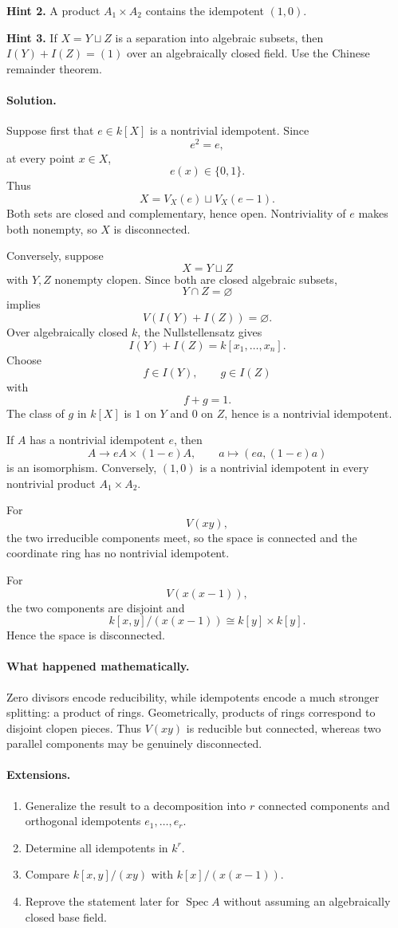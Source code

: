 \textbf{Hint 2.} A product \(A_1\times A_2\) contains the idempotent \((1,0)\).

\textbf{Hint 3.} If \(X=Y\sqcup Z\) is a separation into algebraic subsets, then
\(I(Y)+I(Z)=(1)\) over an algebraically closed field.  Use the Chinese remainder theorem.

\paragraph{Solution.}
Suppose first that \(e\in k[X]\) is a nontrivial idempotent.  Since
\[
e^2=e,
\]
at every point \(x\in X\),
\[
e(x)\in\{0,1\}.
\]
Thus
\[
X=V_X(e)\sqcup V_X(e-1).
\]
Both sets are closed and complementary, hence open.  Nontriviality of \(e\) makes both
nonempty, so \(X\) is disconnected.

Conversely, suppose
\[
X=Y\sqcup Z
\]
with \(Y,Z\) nonempty clopen.  Since both are closed algebraic subsets,
\[
Y\cap Z=\varnothing
\]
implies
\[
V(I(Y)+I(Z))=\varnothing.
\]
Over algebraically closed \(k\), the Nullstellensatz gives
\[
I(Y)+I(Z)=k[x_1,\dots,x_n].
\]
Choose
\[
f\in I(Y),
\qquad
g\in I(Z)
\]
with
\[
f+g=1.
\]
The class of \(g\) in \(k[X]\) is \(1\) on \(Y\) and \(0\) on \(Z\), hence is a
nontrivial idempotent.

If \(A\) has a nontrivial idempotent \(e\), then
\[
A\to eA\times(1-e)A,
\qquad
a\mapsto(ea,(1-e)a)
\]
is an isomorphism.  Conversely, \((1,0)\) is a nontrivial idempotent in every nontrivial
product \(A_1\times A_2\).

For
\[
V(xy),
\]
the two irreducible components meet, so the space is connected and the coordinate ring has
no nontrivial idempotent.

For
\[
V(x(x-1)),
\]
the two components are disjoint and
\[
k[x,y]/(x(x-1))
\cong
k[y]\times k[y].
\]
Hence the space is disconnected.

\paragraph{What happened mathematically.}
Zero divisors encode reducibility, while idempotents encode a much stronger splitting:
a product of rings.  Geometrically, products of rings correspond to disjoint clopen pieces.
Thus \(V(xy)\) is reducible but connected, whereas two parallel components may be genuinely
disconnected.

\paragraph{Extensions.}
\begin{enumerate}
\item Generalize the result to a decomposition into \(r\) connected components and
orthogonal idempotents \(e_1,\dots,e_r\).
\item Determine all idempotents in \(k^r\).
\item Compare \(k[x,y]/(xy)\) with \(k[x]/(x(x-1))\).
\item Reprove the statement later for \(\operatorname{Spec}A\) without assuming an
algebraically closed base field.
\end{enumerate}
\fi
